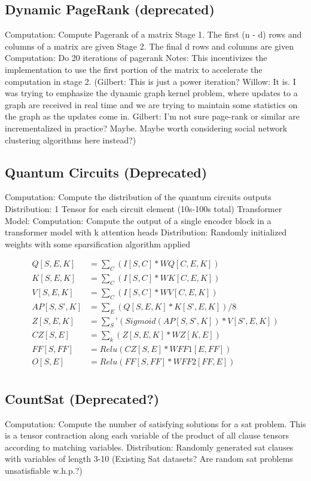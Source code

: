 \documentclass{article}
\begin{document}
\subsection{Dynamic PageRank (deprecated)}
	Computation: Compute Pagerank of a matrix
	Stage 1.
		The first (n - d) rows and columns of a matrix are given
	Stage 2.
		The final d rows and columns are given
	Computation:
		Do 20 iterations of pagerank
	Notes: This incentivizes the implementation to use the first portion of the matrix to accelerate the computation in stage 2.
(Gilbert: This is just a power iteration? Willow: It is. I was trying to emphasize the dynamic graph kernel problem, where updates to a graph are received in real time and we are trying to maintain some statistics on the graph as the updates come in. Gilbert: I'm not sure page-rank or similar are incrementalized in practice?  Maybe.  Maybe worth considering social network clustering algorithms here instead?)

\subsection{Quantum Circuits (Deprecated)}
	Computation: Compute the distribution of the quantum circuits outputs
	Distribution: 1 Tensor for each circuit element (10s-100s total)
Transformer Model:
	Computation: Compute the output of a single encoder block in a transformer model with k attention heads
	Distribution: Randomly initialized weights with some sparsification algorithm applied
 
 \begin{align*}
Q[S, E, K] &= \sum_C(I[S, C] * WQ[C, E, K])\\
K[S, E, K] &= \sum_C(I[S, C] * WK[C, E, K])\\
V[S, E, K] &= \sum_C(I[S, C] * WV[C, E, K])\\
AP[S, S’, K] &= \sum_E(Q[S, E, K] * K[S’, E, K]) / 8\\
Z[S, E, K] &= \sum_S’(Sigmoid(AP[S,S’,K]) * V[S’, E, K])\\
CZ[S, E] &= \sum_k(Z[S, E, K] * WZ[K,E])\\
FF[S,FF] &= Relu(CZ[S,E] * WFF1[E,FF])\\
O[S,E] &= Relu(FF[S,FF] * WFF2[FF,E])\\
\end{align*}

\subsection{CountSat (Deprecated?)}
	Computation: Compute the number of satisfying solutions for a sat problem. This is a tensor contraction along each variable of the product of all clause tensors according to matching variables.
	Distribution: Randomly generated sat clauses with variables of length 3-10 (Existing Sat datasets? Are random sat problems unsatisfiable w.h.p.?)
\end{document}
